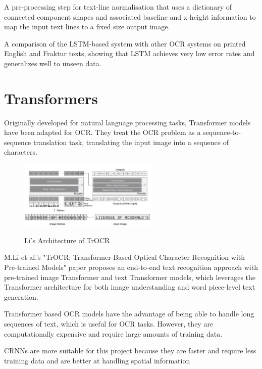 A pre-processing step for text-line normalisation that uses a dictionary of connected component shapes and associated baseline and x-height information to map the input text lines to a fixed size output image.

A comparison of the LSTM-based system with other OCR systems on printed English and Fraktur texts, showing that LSTM achieves very low error rates and generalizes well to unseen data.

\newpage

\section{Transformers}

Originally developed for natural language processing tasks, Transformer models have been adapted for OCR. They treat the OCR problem as a sequence-to-sequence translation task, translating the input image into a sequence of characters.

\begin{figure}[ht]
    \centering
    \includegraphics[width=0.6\textwidth]{Figures/Trans_MLi.jpg}
    \caption[Li's Architecture of TrOCR]{Li's Architecture of TrOCR}\cite{liTrOCRTransformerBasedOptical2023}
    \label{fig:Li's Architecture of TrOCR}
\end{figure}

M.Li et al.'s "TrOCR: Transformer-Based Optical Character Recognition with Pre-trained Models" paper proposes an end-to-end text recognition approach with pre-trained image Transformer and text Transformer models, which leverages the Transformer architecture for both image understanding and word piece-level text generation. \cite{liTrOCRTransformerBasedOptical2023}

Transformer based OCR models have the advantage of being able to handle long sequences of text, which is useful for OCR tasks. However, they are computationally expensive and require large amounts of training data.

CRNNs are more suitable for this project because they are faster and require less training data and are better at handling spatial information

